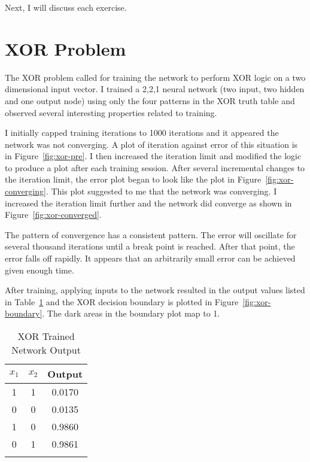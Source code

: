 \documentclass{article}
\begin{document}
Next, I will discuss each exercise.

\section*{XOR Problem}
The XOR problem called for training the network to perform XOR logic
on a two dimensional input vector.  I trained a 2,2,1 neural network
(two input, two hidden and one output node) using only the four
patterns in the XOR truth table and observed several interesting
properties related to training.

I initially capped training iterations to 1000 iterations and it
appeared the network was not converging.  A plot of iteration against
error of this situation is in Figure~\ref{fig:xor-pre}.  I then
increased the iteration limit and modified the logic to produce a plot
after each training session.  After several incremental changes to the
iteration limit, the error plot began to look like the plot in
Figure~\ref{fig:xor-converging}.  This plot suggested to me that the
network was converging.  I increased the iteration limit further and
the network did converge as shown in Figure~\ref{fig:xor-converged}.

The pattern of convergence has a consistent pattern.  The error will
oscillate for several thousand iterations until a break point is
reached. After that point, the error falls off rapidly. It appears
that an arbitrarily small error can be achieved given enough time.

After training, applying inputs to the network resulted in the output
values listed in Table~\ref{table:xor-out} and the XOR decision
boundary is plotted in Figure~\ref{fig:xor-boundary}.  The dark areas
in the boundary plot map to 1.

\begin{table}
  \begin{center}
    \caption{XOR Trained Network Output}
    \begin{tabular}[c]{ c  c | c }
      $ x_1$  & $x_2$ & Output \\
      \hline
      1 & 1 & 0.0170 \\
      0 & 0 & 0.0135 \\
      1 & 0 & 0.9860 \\
      0 & 1 & 0.9861 \\
      \label{table:xor-out}
    \end{tabular}
  \end{center}
\end{table}
\end{document}
